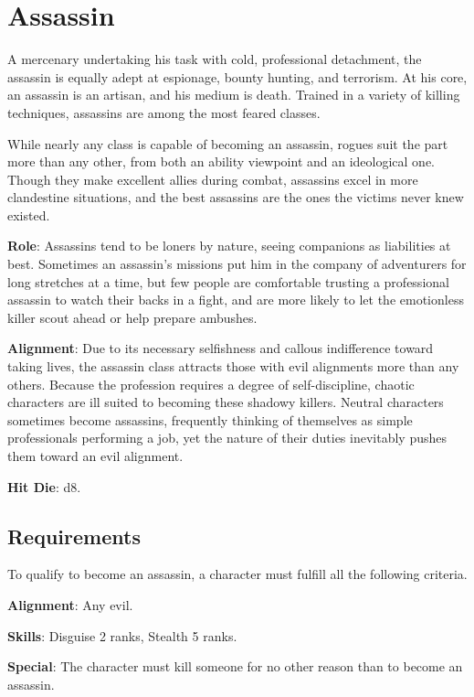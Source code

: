\section{Assassin}

\label{f0}				
A mercenary undertaking his task with cold, professional detachment, the assassin is equally adept at espionage, bounty hunting, and terrorism. At his core, an assassin is an artisan, and his medium is death. Trained in a variety of killing techniques, assassins are among the most feared classes. 
				
While nearly any class is capable of becoming an assassin, rogues suit the part more than any other, from both an ability viewpoint and an ideological one. Though they make excellent allies during combat, assassins excel in more clandestine situations, and the best assassins are the ones the victims never knew existed. 
				
\textbf{Role}: Assassins tend to be loners by nature, seeing companions as liabilities at best. Sometimes an assassin's missions put him in the company of adventurers for long stretches at a time, but few people are comfortable trusting a professional assassin to watch their backs in a fight, and are more likely to let the emotionless killer scout ahead or help prepare ambushes. 
				
\textbf{Alignment}: Due to its necessary selfishness and callous indifference toward taking lives, the assassin class attracts those with evil alignments more than any others. Because the profession requires a degree of self-discipline, chaotic characters are ill suited to becoming these shadowy killers. Neutral characters sometimes become assassins, frequently thinking of themselves as simple professionals performing a job, yet the nature of their duties inevitably pushes them toward an evil alignment.
				
\textbf{Hit Die}: d8.
				
\subsection{Requirements}

				
To qualify to become an assassin, a character must fulfill all the following criteria.
				
\textbf{Alignment}: Any evil.
				
\textbf{Skills}: Disguise 2 ranks, Stealth 5 ranks.
				
\textbf{Special}: The character must kill someone for no other reason than to become an assassin.
				
